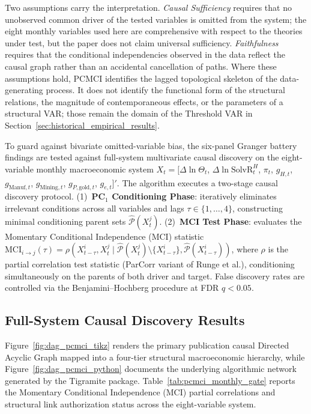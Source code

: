 Two assumptions carry the interpretation. \textit{Causal Sufficiency} requires that no unobserved common driver of the tested variables is omitted from the system; the eight monthly variables used here are comprehensive with respect to the theories under test, but the paper does not claim universal sufficiency. \textit{Faithfulness} requires that the conditional independencies observed in the data reflect the causal graph rather than an accidental cancellation of paths. Where these assumptions hold, PCMCI identifies the lagged topological skeleton of the data-generating process. It does not identify the functional form of the structural relations, the magnitude of contemporaneous effects, or the parameters of a structural VAR; those remain the domain of the Threshold VAR in Section~\ref{sec:historical_empirical_results}.

To guard against bivariate omitted-variable bias, the six-panel Granger battery findings are tested against full-system multivariate causal discovery on the eight-variable monthly macroeconomic system
$X_t = [ \Delta \ln \Theta_t$, $\Delta \ln \text{SolvR}_t^H$, $\pi_t$, $g_{H,t}$, $g_{\text{Manuf},t}$, $g_{\text{Mining},t}$, $g_{P,\text{gold},t}$, $g_{e,t} ]'$.
The algorithm executes a two-stage causal discovery protocol. (1)~\textbf{PC$_1$ Conditioning Phase}: iteratively eliminates irrelevant conditions across all variables and lags $\tau \in \{1, \dots, 4\}$, constructing minimal conditioning parent sets $\widehat{\mathcal{P}}(X^j_t)$. (2)~\textbf{MCI Test Phase}: evaluates the Momentary Conditional Independence (MCI) statistic $\text{MCI}_{i \to j}(\tau) = \rho(X^i_{t-\tau}, X^j_t \mid \widehat{\mathcal{P}}(X^j_t) \setminus \{X^i_{t-\tau}\}, \widehat{\mathcal{P}}(X^i_{t-\tau}))$, where $\rho$ is the partial correlation test statistic (ParCorr variant of Runge et al.), conditioning simultaneously on the parents of both driver and target. False discovery rates are controlled via the Benjamini--Hochberg procedure at FDR $q < 0.05$.

\subsection{Full-System Causal Discovery Results}
Figure~\ref{fig:dag_pcmci_tikz} renders the primary publication causal Directed Acyclic Graph mapped into a four-tier structural macroeconomic hierarchy, while Figure~\ref{fig:dag_pcmci_python} documents the underlying algorithmic network generated by the Tigramite package. Table~\ref{tab:pcmci_monthly_gate} reports the Momentary Conditional Independence (MCI) partial correlations and structural link authorization status across the eight-variable system.

